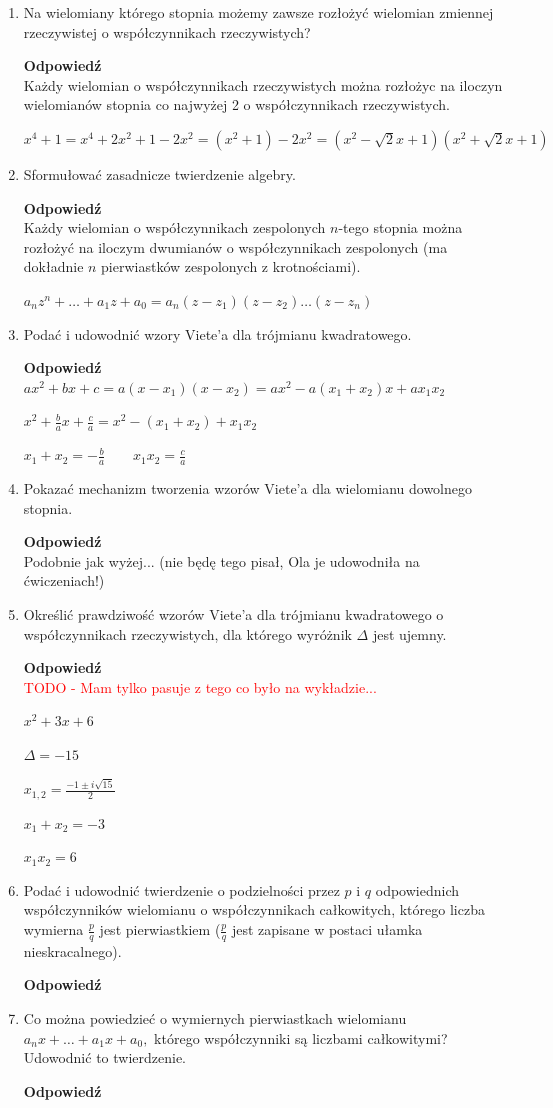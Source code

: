 \documentclass[12pt,a4paper]{article}
\newcounter{twierdzenie}
\theoremstyle{break}
\newcommand{\Odp}[1]{
		\begin{mdframed}[style=zadanie]
			\textbf{Odpowiedź}\\
			#1
		\end{mdframed}
	}
\begin{document}
\begin{enumerate}[1.]
	\item Na wielomiany którego stopnia możemy zawsze rozłożyć wielomian zmiennej rzeczywistej o współczynnikach rzeczywistych?
	\Odp{
		Każdy wielomian o współczynnikach rzeczywistych można rozłożyc na iloczyn wielomianów stopnia co najwyżej 2 o współczynnikach rzeczywistych.
		
		$x^4+1=x^4+2x^2+1-2x^2=(x^2+1)-2x^2 = (x^2-\sqrt{2}x+1)(x^2+\sqrt{2}x+1)$
	}
	
	\item Sformułować zasadnicze twierdzenie algebry.
	\Odp{
		Każdy wielomian o współczynnikach zespolonych $n$-tego stopnia można rozłożyć na iloczym dwumianów o współczynnikach zespolonych (ma dokładnie $n$ pierwiastków zespolonych z krotnościami).
		
		$a_nz^n+\dots+a_1z+a_0=a_n(z-z_1)(z-z_2)\dots(z-z_n)$
	}
	
	\item Podać i udowodnić wzory Viete’a dla trójmianu kwadratowego.
	\Odp{
		$ax^2+bx+c=a(x-x_1)(x-x_2)=ax^2 - a(x_1+x_2)x+ax_1x_2$
		
		$x^2+\frac{b}{a}x+\frac{c}{a}=x^2 - (x_1+x_2) + x_1x_2$
		
		$x_1+x_2 = -\frac{b}{a}\qquad x_1x_2=\frac{c}{a}$
	}
	
	\item Pokazać mechanizm tworzenia wzorów Viete’a dla wielomianu dowolnego stopnia.
	\Odp{
		Podobnie jak wyżej... (nie będę tego pisał, Ola je udowodniła na ćwiczeniach!)
	}
	
	\item Określić prawdziwość wzorów Viete’a dla trójmianu kwadratowego o współczynnikach rzeczywistych, dla którego wyróżnik $\Delta$ jest ujemny.
	\Odp{
		\textcolor{red}{TODO - Mam tylko pasuje z tego co było na wykładzie...}
		
		$x^2+3x+6$
		
		$\Delta=-15$
		
		$x_{1,2}=\frac{-1\pm i\sqrt{15}}{2}$
		
		$x_1+x_2 = -3$
		
		$x_1x_2=6$
	}

	\item Podać i udowodnić twierdzenie o podzielności przez $p$ i $q$ odpowiednich współczynników wielomianu o współczynnikach całkowitych, którego liczba wymierna $\frac{p}{q}$ jest pierwiastkiem ($\frac{p}{q}$ jest zapisane w postaci ułamka nieskracalnego).
	\Odp{
	
	}
	
	\item Co można powiedzieć o wymiernych pierwiastkach wielomianu $a_nx + \dots + a_1x + a_0,$ którego współczynniki są liczbami całkowitymi? Udowodnić to twierdzenie.
	\Odp{
	
}
\end{enumerate}
\end{document}
